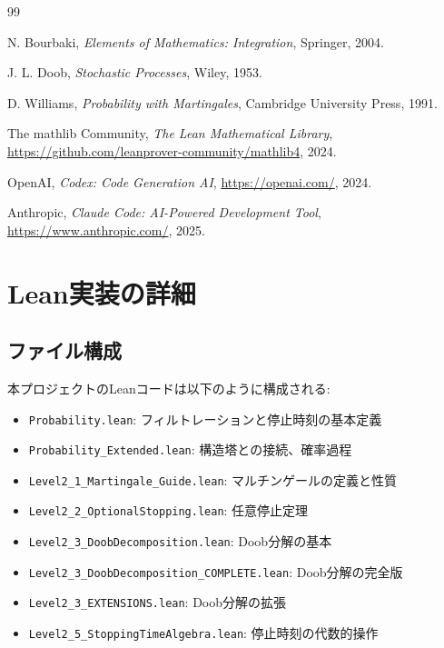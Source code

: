 \documentclass[a4paper,12pt]{ltjsarticle}
\theoremstyle{definition}
\begin{document}
\begin{thebibliography}{99}

N. Bourbaki, \textit{Elements of Mathematics: Integration}, Springer, 2004.

J. L. Doob, \textit{Stochastic Processes}, Wiley, 1953.

D. Williams, \textit{Probability with Martingales}, Cambridge University Press, 1991.

The mathlib Community, \textit{The Lean Mathematical Library},
\url{https://github.com/leanprover-community/mathlib4}, 2024.

OpenAI, \textit{Codex: Code Generation AI}, \url{https://openai.com/}, 2024.

Anthropic, \textit{Claude Code: AI-Powered Development Tool},
\url{https://www.anthropic.com/}, 2025.

\end{thebibliography}

\appendix

\section{Lean実装の詳細}

\subsection{ファイル構成}

本プロジェクトのLeanコードは以下のように構成される:

\begin{itemize}
  \item \texttt{Probability.lean}: フィルトレーションと停止時刻の基本定義
  \item \texttt{Probability\_Extended.lean}: 構造塔との接続、確率過程
  \item \texttt{Level2\_1\_Martingale\_Guide.lean}: マルチンゲールの定義と性質
  \item \texttt{Level2\_2\_OptionalStopping.lean}: 任意停止定理
  \item \texttt{Level2\_3\_DoobDecomposition.lean}: Doob分解の基本
  \item \texttt{Level2\_3\_DoobDecomposition\_COMPLETE.lean}: Doob分解の完全版
  \item \texttt{Level2\_3\_EXTENSIONS.lean}: Doob分解の拡張
  \item \texttt{Level2\_5\_StoppingTimeAlgebra.lean}: 停止時刻の代数的操作
\end{itemize}
\end{document}
